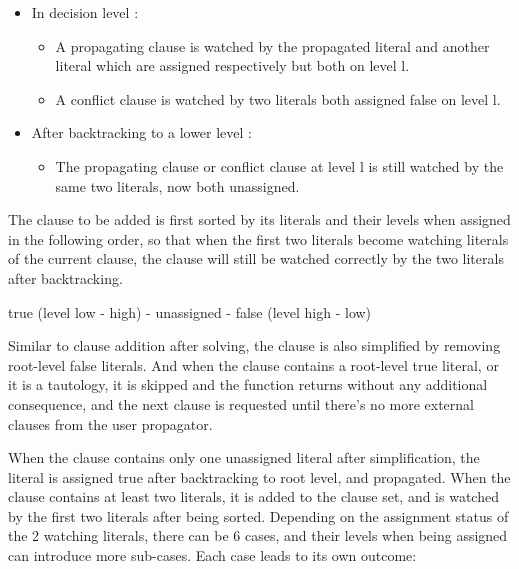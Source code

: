 \begin{itemize}
  \item In decision level :
  \begin{itemize}
    \item A propagating clause is watched by the propagated literal and another literal which are assigned  respectively but both on level l.
    \item A conflict clause is watched by two literals both assigned false on level l.
  \end{itemize}
  \item After backtracking to a lower level :
  \begin{itemize}
    \item The propagating clause or conflict clause at level l is still watched by the same two literals, now both unassigned.
  \end{itemize}
\end{itemize}

The clause to be added is first sorted by its literals and their levels when assigned in the following order, so that when the first two literals become watching literals of the current clause, the clause will still be watched correctly by the two literals after backtracking.

\begin{center}
  true (level low - high) - unassigned - false (level high - low)
\end{center}

Similar to clause addition after solving, the clause is also simplified by removing root-level false literals. And when the clause contains a root-level true literal, or it is a tautology, it is skipped and the function returns without any additional consequence, and the next clause is requested until there's no more external clauses from the user propagator.

When the clause contains only one unassigned literal after simplification, the literal is assigned true after backtracking to root level, and propagated. When the clause contains at least two literals, it is added to the clause set, and is watched by the first two literals after being sorted. Depending on the assignment status of the 2 watching literals, there can be 6 cases, and their levels when being assigned can introduce more sub-cases. Each case leads to its own outcome:

